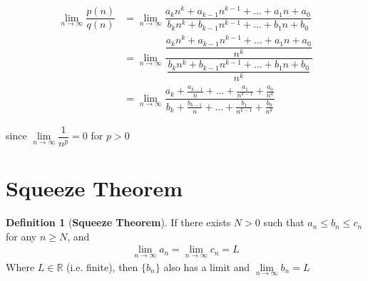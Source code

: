 \documentclass[12pt]{book}
\theoremstyle{definition}
\newtheorem{definition}{Definition}[section]
\begin{document}
\begin{sol}

\begingroup
\addtolength{\jot}{1em}
\begin{align*}
	\lim_{n \to \infty} \dfrac{p(n)}{q(n)} & = \lim_{n \to \infty}  \dfrac{a_kn^k+a_{k-1}n^{k-1}+ ...  + a_1n+a_0}{b_kn^k+b_{k-1}n^{k-1}+ ...  + b_1n+b_0}\\
	& =   \lim_{n \to \infty}  \dfrac{ \dfrac{a_kn^k+a_{k-1}n^{k-1}+ ...  + a_1n+a_0}{n^k}}{\dfrac{b_kn^k+b_{k-1}n^{k-1}+ ...  + b_1n+b_0}{n^k}} \\
	&=  \lim_{n \to \infty} \dfrac{a_k+\frac{a_{k-1}}{n}+ ...  + \frac{a_1}{n^{k-1}}+\frac{a_0}{n^k}}{b_k+\frac{b_{k-1}}{n}+ ...  + \frac{b_1}{n^{k-1}}+\frac{b_0}{n^k}}
\end{align*}
\endgroup

since $\lim\limits_{n \to \infty}\dfrac{1}{n^p} =0$ for $p >0$

\end{sol}


\section{Squeeze Theorem}

\begin{definition}[\textbf{Squeeze Theorem}]
\label{formal_def_squeze_thm}
If there exists $N >0$ such that $a_n \leq b_n \leq c_n$ for any $n\geq N$, and
\begin{align*}
\lim\limits_{n \to \infty}	a_n = \lim\limits_{n \to \infty} c_n = L
\end{align*}
 Where $L \in \mathbb{R}$ (i.e. finite), then $\{b_n\}$ also has a limit and $\lim\limits_{n \to \infty}b_n =L$
	
\end{definition}
\end{document}

